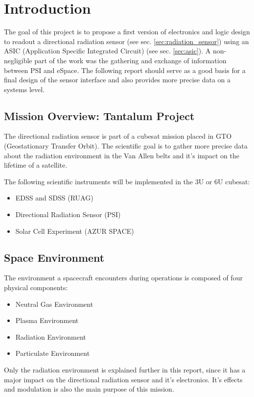 \section{Introduction}
\label{sec:introduction}
The goal of this project is to propose a first version of electronics and logic design to readout a directional radiation sensor (see sec. \ref{sec:radiation_sensor}) using an ASIC (Application Specific Integrated Circuit) (see sec. \ref{sec:asic}).
A non-negligible part of the work was the gathering and exchange of information between PSI and eSpace.
The following report should serve as a good basis for a final design of the sensor interface and also provides more precise data on a systems level.

\subsection{Mission Overview: Tantalum Project}
\label{sec:mission_overview}
The directional radiation sensor is part of a cubesat mission placed in GTO (Geostationary Transfer Orbit).
The scientific goal is to gather more precise data about the radiation environment in the Van Allen belts and it's impact on the lifetime of a satellite.

The following scientific instruments will be implemented in the 3U or 6U cubesat:\cite{tantalumproject2016}
\begin{itemize}
	\item EDSS and SDSS (RUAG)
	\item Directional Radiation Sensor (PSI)
	\item Solar Cell Experiment (AZUR SPACE)
\end{itemize}


\subsection{Space Environment}
\label{sec:space_environment}
The environment a spacecraft encounters during operations is composed of four physical components:\cite{hastings2004spacecraft}
\begin{itemize}
	\item Neutral Gas Environment
	\item Plasma Environment
	\item Radiation Environment
	\item Particulate Environment
\end{itemize}

Only the radiation environment is explained further in this report, since it has a major impact on the directional radiation sensor and it's electronics.
It's effects and modulation is also the main purpose of this mission.


